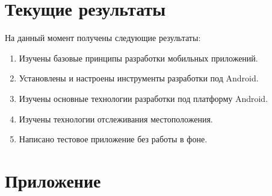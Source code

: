 \documentclass[a4paper,12pt]{article}
\begin{document}

\pagebreak


\section{Текущие результаты}

На данный момент получены следующие результаты:

\begin{enumerate}
\item Изучены базовые принципы разработки мобильных приложений.
\item Установлены и настроены инструменты разработки под Android.
\item Изучены основные технологии разработки под платформу Android.
\item Изучены технологии отслеживания местоположения.
\item Написано тестовое приложение без работы в фоне.
\end{enumerate}




\pagebreak
\section{Приложение}
\end{document}
